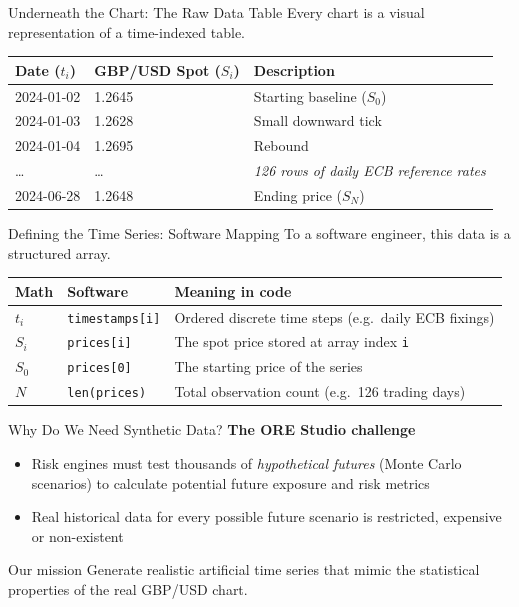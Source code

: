 \documentclass[aspectratio=169,11pt]{beamer}
\newcommand{\code}[1]{\texttt{#1}}
\begin{document}
\begin{frame}{Underneath the Chart: The Raw Data Table}
  Every chart is a visual representation of a time-indexed table.
  \bigskip

  \centering
  \begin{tabular}{lll}
    \toprule
    Date ($t_i$) & GBP/USD Spot ($S_i$) & Description \\
    \midrule
    2024-01-02 & 1.2645 & Starting baseline ($S_0$) \\
    2024-01-03 & 1.2628 & Small downward tick \\
    2024-01-04 & 1.2695 & Rebound \\
    \dots & \dots & \emph{126 rows of daily ECB reference rates} \\
    2024-06-28 & 1.2648 & Ending price ($S_N$) \\
    \bottomrule
  \end{tabular}
\end{frame}

\begin{frame}{Defining the Time Series: Software Mapping}
  To a software engineer, this data is a structured array.
  \bigskip

  \centering
  \begin{tabularx}{\textwidth}{llY}
    \toprule
    Math & Software & Meaning in code \\
    \midrule
    $t_i$ & \code{timestamps[i]} & Ordered discrete time steps (e.g.\ daily ECB fixings) \\
    $S_i$ & \code{prices[i]} & The spot price stored at array index \code{i} \\
    $S_0$ & \code{prices[0]} & The starting price of the series \\
    $N$ & \code{len(prices)} & Total observation count (e.g.\ 126 trading days) \\
    \bottomrule
  \end{tabularx}
\end{frame}

\begin{frame}{Why Do We Need Synthetic Data?}
  \textbf{The ORE Studio challenge}
  \begin{itemize}
    \item Risk engines must test thousands of \emph{hypothetical futures} (Monte Carlo scenarios) to calculate potential future exposure and risk metrics
    \item Real historical data for every possible future scenario is restricted, expensive or non-existent
  \end{itemize}
  \bigskip

  \begin{alertblock}{Our mission}
    Generate realistic artificial time series that mimic the statistical properties of the real GBP/USD chart.
  \end{alertblock}
\end{frame}
\end{document}
